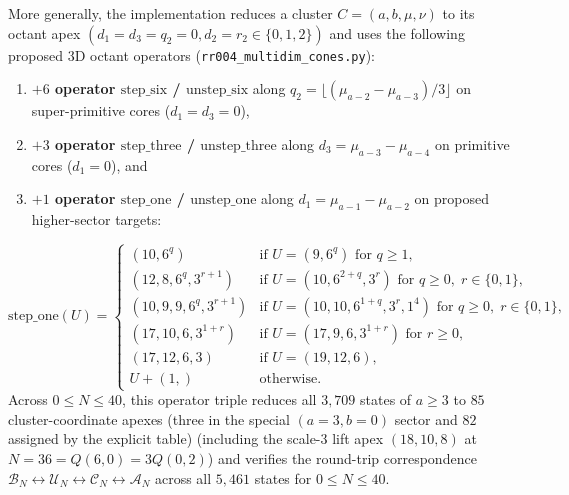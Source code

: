 \documentclass[11pt]{article}
\theoremstyle{definition}
\begin{document}
More generally, the implementation reduces a cluster $C=(a,b,\mu,\nu)$ to its octant apex $(d_1 = d_3 = q_2 = 0, d_2 = r_2 \in \{0, 1, 2\})$ and uses the following proposed $3\mathrm{D}$ octant operators (\nolinkurl{rr004_multidim_cones.py}):
\begin{enumerate}
  \item \textbf{$+6$ operator $\mathrm{step\_six}$ / $\mathrm{unstep\_six}$} along $q_2 = \lfloor (\mu_{a-2} - \mu_{a-3}) / 3 \rfloor$ on super-primitive cores ($d_1 = d_3 = 0$),
  \item \textbf{$+3$ operator $\mathrm{step\_three}$ / $\mathrm{unstep\_three}$} along $d_3 = \mu_{a-3} - \mu_{a-4}$ on primitive cores ($d_1 = 0$), and
  \item \textbf{$+1$ operator $\mathrm{step\_one}$ / $\mathrm{unstep\_one}$} along $d_1 = \mu_{a-1} - \mu_{a-2}$ on proposed higher-sector targets:
\end{enumerate}
\[
  \mathrm{step\_one}(U) = \begin{cases}
    (10, 6^q) & \text{if } U = (9, 6^q) \text{ for } q \ge 1, \\
    (12, 8, 6^q, 3^{r+1}) & \text{if } U = (10, 6^{2+q}, 3^r) \text{ for } q \ge 0,\; r \in \{0, 1\}, \\
    (10, 9, 9, 6^q, 3^{r+1}) & \text{if } U = (10, 10, 6^{1+q}, 3^r, 1^4) \text{ for } q \ge 0,\; r \in \{0, 1\}, \\
    (17, 10, 6, 3^{1+r}) & \text{if } U = (17, 9, 6, 3^{1+r}) \text{ for } r \ge 0, \\
    (17, 12, 6, 3) & \text{if } U = (19, 12, 6), \\
    U + (1,) & \text{otherwise.}
  \end{cases}
\]
Across $0 \le N \le 40$, this operator triple reduces all $3{,}709$ states of $a \ge 3$ to $85$ cluster-coordinate apexes (three in the special $(a=3,b=0)$ sector and $82$ assigned by the explicit table) (including the scale-$3$ lift apex $(18, 10, 8)$ at $N = 36 = Q(6, 0) = 3Q(0, 2)$) and verifies the round-trip correspondence $\mathcal{B}_N \leftrightarrow \mathcal{U}_N \leftrightarrow \mathcal{C}_N \leftrightarrow \mathcal{A}_N$ across all $5{,}461$ states for $0 \le N \le 40$.
\end{document}
